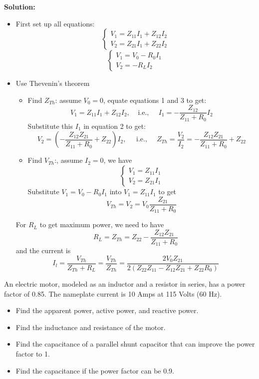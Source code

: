 {\bf Solution:} 
\begin{itemize}
\item First set up all equations:
\[ \left\{ \begin{array}{l} V_1=Z_{11}I_1+Z_{12}I_2 \\
	V_2=Z_{21}I_1+Z_{22}I_2 \end{array} \right.	\]
\[ \left\{ \begin{array}{l} V_1=V_0-R_0I_1 \\
	V_2=-R_L I_2 \end{array} \right.	\]
\item Use Thevenin's theorem

\begin{itemize}
\item Find $Z_{Th}$: assume $V_0=0$, equate equations 1 and 3 to get:
\[ V_1=Z_{11}I_1+Z_{12}I_2, \;\;\;\;\mbox{i.e.,}\;\;\;\;\;
I_1=-\frac{Z_{12}}{Z_{11}+R_0} I_2 \]
Substitute this $I_1$ in equation 2 to get:
\[ V_2=(-\frac{Z_{12}Z_{21}}{Z_{11}+R_0}+Z_{22}) I_2,\;\;\;\;\;
\mbox{i.e.,}\;\;\;\;\;
Z_{Th}=\frac{V_2}{I_2}=-\frac{Z_{12}Z_{21}}{Z_{11}+R_0}+Z_{22}	\]
\item Find $V_{Th}$:, assume $I_2=0$, we have
\[ \left\{\begin{array}{l} V_1=Z_{11}I_1 \\V_2=Z_{21}I_1\end{array}\right. \]
Substitute $V_1=V_0-R_0I_1$ into $V_1=Z_{11}I_1$ to get
\[	V_{Th}=V_2=V_0\frac{Z_{21}}{Z_{11}+R_0}	\]
\end{itemize}

For $R_L$ to get maximum power, we need to have
\[ R_L=Z_{Th}=Z_{22}-\frac{Z_{12}Z_{21}}{Z_{11}+R_0}	\]
and the current is
\[ I_l=\frac{V_{Th}}{Z_{Th}+R_L}=\frac{V_{Th}}{Z_{Th}}
	=\frac{2V_0Z_{21}}{2(Z_{22}Z_{11}-Z_{12}Z_{21}+Z_{22}R_0)} \]


\end{itemize}


An electric motor, modeled as an inductor and a resistor in series, has 
a power factor of 0.85. The nameplate current is 10 Amps at 115 Volts 
(60 Hz). 
\begin{itemize}
\item Find the apparent power, active power, and reactive power. 
\item Find the inductance and resistance of the motor.
\item Find the capacitance of a parallel shunt capacitor that can improve
	the power factor to 1.
\item Find the capacitance if the power factor can be 0.9.
\end{itemize}

